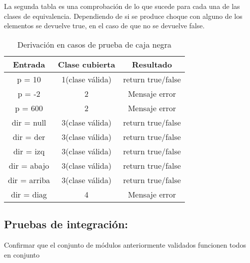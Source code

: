 La segunda tabla es una comprobación de lo que sucede para cada una de las clases de equivalencia. Dependiendo de si se produce choque con alguno de los elementos se devuelve true, en el caso de que no se devuelve false.
\begin{table}[H]
	\begin{center}
		\begin{tabular}{ccc}
			\hline
			Entrada		& Clase cubierta		& Resultado \\ \hline
			p =	10		&1(clase válida)		&return true/false\\
			p =	-2		&2						&Mensaje error\\
			p =	600		&2						&Mensaje error\\
			dir = null  &3(clase válida)		&return true/false\\
			dir = der   &3(clase válida)		&return true/false\\
			dir = izq   &3(clase válida)		&return true/false\\
			dir = abajo &3(clase válida)		&return true/false\\
			dir = arriba&3(clase válida)		&return true/false\\
			dir = diag	&4						&Mensaje error\\
		\end{tabular}
		\caption{Derivación en casos de prueba de caja negra}
		\label{table:derivacion}
	\end{center}
\end{table}
\subsection{Pruebas de integración:}
Confirmar que el conjunto de módulos anteriormente validados funcionen todos en conjunto


